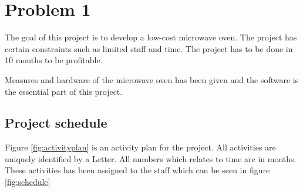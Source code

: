 \chapter{Problem 1}
\label{chp:intro}

The goal of this project is to develop a low-cost microwave oven. 
The project has certain constraints such as limited staff and time. The project has to be done in 10 months to be profitable. 

Measures and hardware of the microwave oven has been given and the software is the essential part of this project.

\section{Project schedule}
Figure \ref{fig:activityplan} is an activity plan for the project. All activities are uniquely identified by a Letter. All numbers which relates to time are in months. These activities has been assigned to the staff which can be seen in figure \ref{fig:schedule} 
